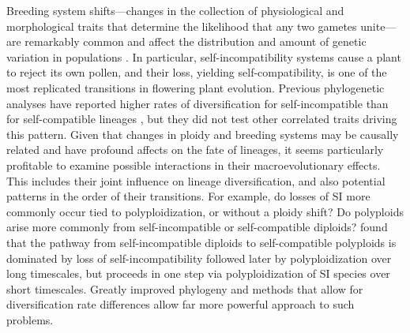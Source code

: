 Breeding system shifts---changes in the collection of physiological and morphological traits that determine the likelihood that any two gametes unite---are remarkably common and affect the distribution and amount of genetic variation in populations \citep{stebbins1974, barrett2013}.
In particular, self-incompatibility systems cause a plant to reject its own pollen, and their loss, yielding self-compatibility, is one of the most replicated transitions in flowering plant evolution. %
Previous phylogenetic analyses have reported higher rates of diversification for self-incompatible than for self-compatible lineages \citep{goldberg_2010, devos2014, freyman_2018}, but they did not test other correlated traits driving this pattern.
Given that changes in ploidy and breeding systems may be causally related and have profound affects on the fate of lineages, it seems particularly profitable to examine possible interactions in their macroevolutionary effects.
This includes their joint influence on lineage diversification, and also potential patterns in the order of their transitions.
For example, do losses of SI more commonly occur tied to polyploidization, or without a ploidy shift?
Do polyploids arise more commonly from self-incompatible or self-compatible diploids?
 found that the pathway from self-incompatible diploids to self-compatible polyploids is dominated by loss of self-incompatibility followed later by polyploidization over long timescales, but proceeds in one step via polyploidization of SI species over short timescales.
Greatly improved phylogeny and methods that allow for diversification rate differences allow far more powerful approach to such problems. %

